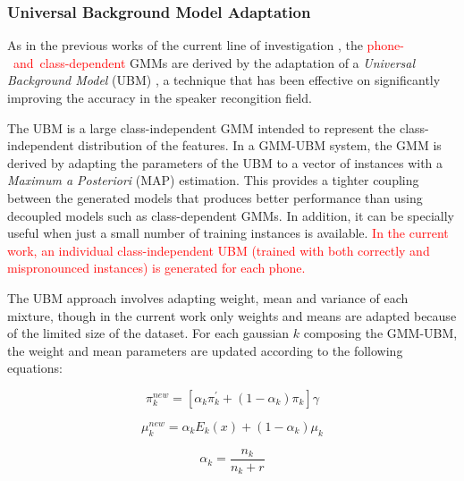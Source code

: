 
\subsubsection{Universal Background Model Adaptation}

As in the previous works of the current line of investigation
\cite{detection_phone_level_mispronunciation_learning, main},
the \mbox{\textcolor{red}{phone- and class-dependent}} GMMs are derived by the adaptation of a
\textit{Universal Background Model} (UBM)
\cite{ubm_adaptation}, a technique that has been effective on significantly improving
the accuracy in the speaker recongition field.

The UBM is a large class-independent GMM intended to represent the class-independent distribution
of the features. In a GMM-UBM system, the GMM is derived by adapting the parameters of the UBM
to a vector of instances with a \textit{Maximum a Posteriori} (MAP) estimation. This provides a
tighter coupling between the generated models that produces better performance than using
decoupled models such as class-dependent GMMs. In addition, it can be specially useful when
just a small number of training instances is available.
\textcolor{red}{In the current work, an individual
class-independent UBM (trained with both correctly and mispronounced instances)
is generated for each phone.}

The UBM approach involves adapting weight, mean and variance of each
mixture, though in the current work only weights and means are adapted because of the limited
size of the dataset. For each gaussian $k$ composing the GMM-UBM, the weight and mean parameters
are updated according to the following equations:

\begin{equation}
  \pi_{k}^{new} = [\alpha_{k} \pi_{k}^{'} + (1-\alpha_{k}) \pi_{k}]\gamma
\end{equation}

\begin{equation}
  \mu_{k}^{new} = \alpha_{k} E_{k}(x) + (1-\alpha_{k})\mu_{k}
\end{equation}

\begin{equation}
  \alpha_{k} = \frac{n_{k}}{n_{k}+r}
\end{equation}

